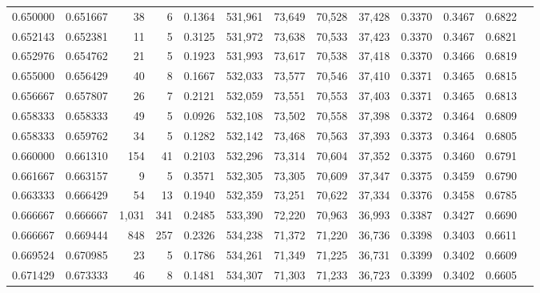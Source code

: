 \begin{tabular}{rrrrrrrrrrrrr}
0.650000 & 0.651667 &     38 &      6 &                                     0.1364 & 531,961 &  73,649 &  70,528 &  37,428 & 0.3370 & 0.3467 & 0.6822 \\
0.652143 & 0.652381 &     11 &      5 &                                     0.3125 & 531,972 &  73,638 &  70,533 &  37,423 & 0.3370 & 0.3467 & 0.6821 \\
0.652976 & 0.654762 &     21 &      5 &                                     0.1923 & 531,993 &  73,617 &  70,538 &  37,418 & 0.3370 & 0.3466 & 0.6819 \\
0.655000 & 0.656429 &     40 &      8 &                                     0.1667 & 532,033 &  73,577 &  70,546 &  37,410 & 0.3371 & 0.3465 & 0.6815 \\
0.656667 & 0.657807 &     26 &      7 &                                     0.2121 & 532,059 &  73,551 &  70,553 &  37,403 & 0.3371 & 0.3465 & 0.6813 \\
0.658333 & 0.658333 &     49 &      5 &                                     0.0926 & 532,108 &  73,502 &  70,558 &  37,398 & 0.3372 & 0.3464 & 0.6809 \\
0.658333 & 0.659762 &     34 &      5 &                                     0.1282 & 532,142 &  73,468 &  70,563 &  37,393 & 0.3373 & 0.3464 & 0.6805 \\
0.660000 & 0.661310 &    154 &     41 &                                     0.2103 & 532,296 &  73,314 &  70,604 &  37,352 & 0.3375 & 0.3460 & 0.6791 \\
0.661667 & 0.663157 &      9 &      5 &                                     0.3571 & 532,305 &  73,305 &  70,609 &  37,347 & 0.3375 & 0.3459 & 0.6790 \\
0.663333 & 0.666429 &     54 &     13 &                                     0.1940 & 532,359 &  73,251 &  70,622 &  37,334 & 0.3376 & 0.3458 & 0.6785 \\
0.666667 & 0.666667 &  1,031 &    341 &                                     0.2485 & 533,390 &  72,220 &  70,963 &  36,993 & 0.3387 & 0.3427 & 0.6690 \\
0.666667 & 0.669444 &    848 &    257 &                                     0.2326 & 534,238 &  71,372 &  71,220 &  36,736 & 0.3398 & 0.3403 & 0.6611 \\
0.669524 & 0.670985 &     23 &      5 &                                     0.1786 & 534,261 &  71,349 &  71,225 &  36,731 & 0.3399 & 0.3402 & 0.6609 \\
0.671429 & 0.673333 &     46 &      8 &                                     0.1481 & 534,307 &  71,303 &  71,233 &  36,723 & 0.3399 & 0.3402 & 0.6605 \\

\end{tabular}
